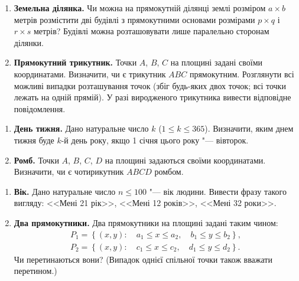 	\vspace{1cm}
	
	
	{\large
		\begin{enumerate}
			\item \textbf{Земельна ділянка.} Чи можна на прямокутній ділянці землі розміром $a\times b$ метрів розмістити дві будівлі з прямокутними основами розмірами $p\times q$ і $r\times s$ метрів? Будівлі можна розташовувати лише паралельно сторонам ділянки.
			\item \textbf{Прямокутний трикутник.} Точки $A$, $B$, $C$ на площині задані своїми координатами. Визначити, чи є трикутник $ABC$ прямокутним. Розглянути всі можливі випадки розташування точок (збіг будь-яких двох точок; всі точки лежать на одній прямій). У разі виродженого трикутника вивести відповідне повідомлення.
		\end{enumerate}
	}
	
	\vspace{1cm}
	
	
	{\large
		\begin{enumerate}
			\item \textbf{День тижня.} Дано натуральне число $k$ ($1\leqslant k\leqslant 365$). Визначити, яким днем тижня буде $k$-й день року, якщо 1 січня цього року "--- вівторок.
			\item \textbf{Ромб.} Точки $A$, $B$, $C$, $D$ на площині задаються своїми координатами. Визначити, чи є чотирикутник $ABCD$ ромбом.
		\end{enumerate}
	}
	
	\vspace{1cm}
	
	
	{\large
		\begin{enumerate}
			\item \textbf{Вік.} Дано натуральне число $n\leqslant 100$ "--- вік людини. Вивести фразу такого вигляду: <<Мені 21 рік>>, <<Мені 12 років>>, <<Мені 32 роки>>.
			\item \textbf{Два прямокутники.} Два прямокутники на площині задані таким чином:
			$$
			\begin{array}{c}
				P_1 = \left\{(x, y):\quad a_1\leqslant x\leqslant a_2,\quad b_1\leqslant y\leqslant b_2\right\},\\ 
				P_2 = \left\{(x, y):\quad c_1\leqslant x\leqslant c_2,\quad d_1\leqslant y\leqslant d_2\right\}.
			\end{array}
			$$
			Чи перетинаються вони? (Випадок однієї спільної точки також вважати перетином.)
		\end{enumerate}
	}
	
	\vspace{1cm}
	